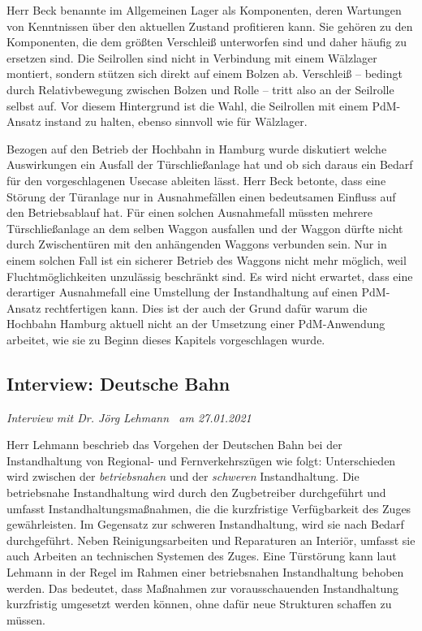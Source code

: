 Herr Beck benannte im Allgemeinen Lager als Komponenten, deren Wartungen von Kenntnissen über den aktuellen Zustand profitieren kann. Sie gehören zu den Komponenten, die dem größten Verschleiß unterworfen sind und daher häufig zu ersetzen sind. Die Seilrollen sind nicht in Verbindung mit einem Wälzlager montiert, sondern stützen sich direkt auf einem Bolzen ab. Verschleiß -- bedingt durch Relativbewegung zwischen Bolzen und Rolle -- tritt also an der Seilrolle selbst auf. Vor diesem Hintergrund ist die Wahl, die Seilrollen mit einem PdM-Ansatz instand zu halten, ebenso sinnvoll wie für Wälzlager.

Bezogen auf den Betrieb der Hochbahn in Hamburg wurde diskutiert welche Auswirkungen ein Ausfall der Türschließanlage hat und ob sich daraus ein Bedarf für den vorgeschlagenen Usecase ableiten lässt. Herr Beck betonte, dass eine Störung der Türanlage nur in Ausnahmefällen einen bedeutsamen Einfluss auf den Betriebsablauf hat. Für einen solchen Ausnahmefall müssten mehrere Türschließanlage an dem selben Waggon ausfallen und der Waggon dürfte nicht durch Zwischentüren mit den anhängenden Waggons verbunden sein. Nur in einem solchen Fall ist ein sicherer Betrieb des Waggons nicht mehr möglich, weil Fluchtmöglichkeiten unzulässig beschränkt sind. Es wird nicht erwartet, dass eine derartiger Ausnahmefall eine Umstellung der Instandhaltung auf einen PdM-Ansatz rechtfertigen kann. Dies ist der auch der Grund dafür warum die Hochbahn Hamburg aktuell nicht an der Umsetzung einer PdM-Anwendung arbeitet, wie sie zu Beginn dieses Kapitels vorgeschlagen wurde.
\subsection{Interview: Deutsche Bahn}
\label{subsec:interview_deutsche_bahn}
\textit{Interview mit Dr. Jörg Lehmann~\cite{db.2021} am {27.01.2021}}

Herr Lehmann beschrieb das Vorgehen der Deutschen Bahn bei der Instandhaltung von Regional- und Fernverkehrszügen wie folgt: Unterschieden wird zwischen der \textit{betriebsnahen} und der \textit{schweren} Instandhaltung. Die betriebsnahe Instandhaltung wird durch den Zugbetreiber durchgeführt und umfasst Instandhaltungsmaßnahmen, die die kurzfristige Verfügbarkeit des Zuges gewährleisten. Im Gegensatz zur schweren Instandhaltung, wird sie nach Bedarf durchgeführt. Neben Reinigungsarbeiten und Reparaturen an Interiör, umfasst sie auch Arbeiten an technischen Systemen des Zuges. Eine Türstörung kann laut Lehmann in der Regel im Rahmen einer betriebsnahen Instandhaltung behoben werden. Das bedeutet, dass Maßnahmen zur vorausschauenden Instandhaltung kurzfristig umgesetzt werden können, ohne dafür neue Strukturen schaffen zu müssen.

